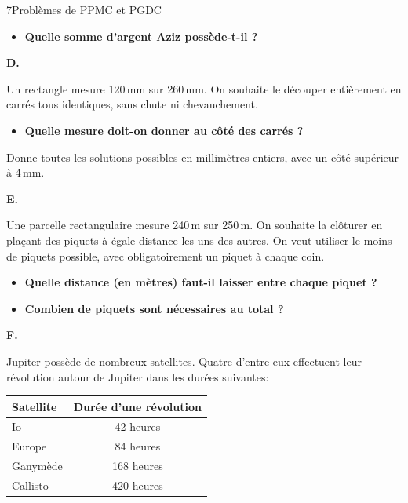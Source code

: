 \begin{exercice}{7}{Problèmes de PPMC et PGDC}
\begin{itemize}[label=$\blacktriangleright$]
\item \textbf{Quelle somme d'argent Aziz possède-t-il ?}
\end{itemize}

\bigskip\textbf{D.}

\medskip
Un rectangle mesure 120\,mm sur 260\,mm.
On souhaite le découper entièrement en carrés tous identiques, sans chute ni chevauchement.

\begin{itemize}[label=$\blacktriangleright$]
\item \textbf{Quelle mesure doit-on donner au côté des carrés ?}
\end{itemize}

Donne toutes les solutions possibles en millimètres entiers, avec un côté supérieur à 4\,mm.

\bigskip\textbf{E.}

\medskip
Une parcelle rectangulaire mesure 240\,m sur 250\,m. On souhaite la clôturer en plaçant des piquets à égale distance les uns des autres. On veut utiliser le moins de piquets possible, avec obligatoirement un piquet à chaque coin.

\begin{itemize}[label=$\blacktriangleright$]
\item \textbf{Quelle distance (en mètres) faut-il laisser entre chaque piquet ?}
\item \textbf{Combien de piquets sont nécessaires au total ?}
\end{itemize}

\bigskip\textbf{F.}

\medskip
Jupiter possède de nombreux satellites. Quatre d'entre eux effectuent leur révolution autour de Jupiter dans les durées suivantes:

\begin{center}
\begin{tabular}{lc}
    \hline
    \textbf{Satellite} & \textbf{Durée d'une révolution} \\
    \hline
    Io         & 42 heures  \\
    Europe     & 84 heures  \\
    Ganymède   & 168 heures \\
    Callisto   & 420 heures \\
    \hline
\end{tabular}
\end{center}


\end{exercice}
